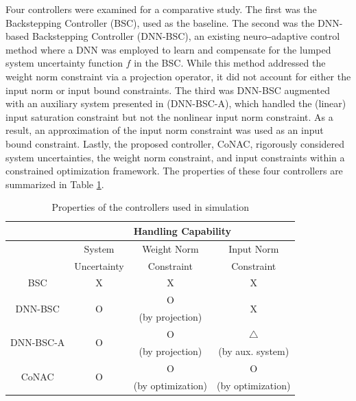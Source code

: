 \documentclass[lettersize,journal]{IEEEtran}
\begin{document}
Four controllers were examined for a comparative study. The first was the Backstepping Controller (BSC), used as the baseline. The second was the DNN-based Backstepping Controller (DNN-BSC), an existing neuro‒adaptive control method where a DNN was employed to learn and compensate for the lumped system uncertainty function $f$ in the BSC. While this method addressed the weight norm constraint via a projection operator, it did not account for either the input norm or input bound constraints. The third was DNN-BSC augmented with an auxiliary system presented in \cite{RN55, RN56, RN3} (DNN-BSC-A), which handled the (linear) input saturation constraint but not the nonlinear input norm constraint. As a result, an approximation of the input norm constraint was used as an input bound constraint. Lastly, the proposed controller, CoNAC, rigorously considered system uncertainties, the weight norm constraint, and input constraints within a constrained optimization framework. The properties of these four controllers are summarized in Table \ref{table:controller}.

\begin{table}[!t]
    \renewcommand{\arraystretch}{1.3}
    \caption{Properties of the controllers used in simulation}
    \label{table:controller}
    \centering
    \begin{tabular}{|c||c|c|c|}
    \hline
    & \multicolumn{3}{c|}{Handling Capability}\\
    \hline
    & System & Weight Norm & Input Norm\\
    &  Uncertainty & Constraint & Constraint\\
    \hline 
    BSC     & X & X & X\\
    \hline
    \multirow{2}{*}{DNN-BSC}     & \multirow{2}{*}{O} & O & \multirow{2}{*}{X}\\
         &  & (by projection) & \\
    \hline
    \multirow{2}{*}{DNN-BSC-A}   & \multirow{2}{*}{O} & O & $\triangle$ \\
       &  & (by projection) &  (by aux. system)\\
    \hline
    \multirow{2}{*}{CoNAC}     &  \multirow{2}{*}{O} & O & O\\
         &  & (by optimization) & (by optimization)\\
    \hline
    \end{tabular}
\end{table}
\end{document}
